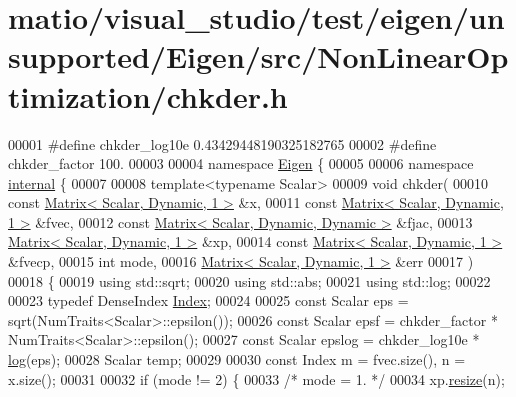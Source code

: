 \hypertarget{matio_2visual__studio_2test_2eigen_2unsupported_2_eigen_2src_2_non_linear_optimization_2chkder_8h_source}{}\section{matio/visual\+\_\+studio/test/eigen/unsupported/\+Eigen/src/\+Non\+Linear\+Optimization/chkder.h}
\label{matio_2visual__studio_2test_2eigen_2unsupported_2_eigen_2src_2_non_linear_optimization_2chkder_8h_source}

\begin{DoxyCode}
00001 \textcolor{preprocessor}{#define chkder\_log10e 0.43429448190325182765}
00002 \textcolor{preprocessor}{#define chkder\_factor 100.}
00003 
00004 \textcolor{keyword}{namespace }\hyperlink{namespace_eigen}{Eigen} \{ 
00005 
00006 \textcolor{keyword}{namespace }\hyperlink{namespaceinternal}{internal} \{
00007 
00008 \textcolor{keyword}{template}<\textcolor{keyword}{typename} Scalar>
00009 \textcolor{keywordtype}{void} chkder(
00010         \textcolor{keyword}{const} \hyperlink{group___core___module}{Matrix< Scalar, Dynamic, 1 >}  &x,
00011         \textcolor{keyword}{const} \hyperlink{group___core___module}{Matrix< Scalar, Dynamic, 1 >}  &fvec,
00012         \textcolor{keyword}{const} \hyperlink{group___core___module}{Matrix< Scalar, Dynamic, Dynamic >} &fjac,
00013         \hyperlink{group___core___module}{Matrix< Scalar, Dynamic, 1 >}  &xp,
00014         \textcolor{keyword}{const} \hyperlink{group___core___module}{Matrix< Scalar, Dynamic, 1 >}  &fvecp,
00015         \textcolor{keywordtype}{int} mode,
00016         \hyperlink{group___core___module}{Matrix< Scalar, Dynamic, 1 >}  &err
00017         )
00018 \{
00019     \textcolor{keyword}{using} std::sqrt;
00020     \textcolor{keyword}{using} std::abs;
00021     \textcolor{keyword}{using} std::log;
00022     
00023     \textcolor{keyword}{typedef} DenseIndex \hyperlink{namespace_eigen_a62e77e0933482dafde8fe197d9a2cfde}{Index};
00024 
00025     \textcolor{keyword}{const} Scalar eps = sqrt(NumTraits<Scalar>::epsilon());
00026     \textcolor{keyword}{const} Scalar epsf = chkder\_factor * NumTraits<Scalar>::epsilon();
00027     \textcolor{keyword}{const} Scalar epslog = chkder\_log10e * \hyperlink{structlog}{log}(eps);
00028     Scalar temp;
00029 
00030     \textcolor{keyword}{const} Index m = fvec.size(), n = x.size();
00031 
00032     \textcolor{keywordflow}{if} (mode != 2) \{
00033         \textcolor{comment}{/* mode = 1. */}
00034         xp.\hyperlink{class_eigen_1_1_plain_object_base_a99d9054ee2d5a40c6e00ded0265e9cea}{resize}(n);

\end{DoxyCode}

